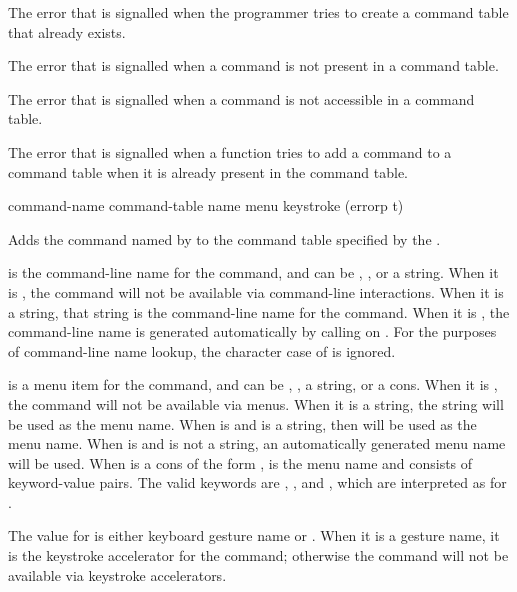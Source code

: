 
The error that is signalled when the programmer tries to create a command table
that already exists.


The error that is signalled when a command is not present in a command table.


The error that is signalled when a command is not accessible in a command table.


The error that is signalled when a function tries to add a command to a command
table when it is already present in the command table.


 {command-name command-table 
                                       \key name menu keystroke (errorp t)}

Adds the command named by  to the command table specified by
the  .

 is the command-line name for the command, and can be ,
, or a string.  When it is , the command will not be available via
command-line interactions.  When it is a string, that string is the command-line
name for the command.  When it is , the command-line name is generated
automatically by calling  on .
For the purposes of command-line name lookup, the character case of 
is ignored.

 is a menu item for the command, and can be , , a
string, or a cons.  When it is , the command will not be available via
menus.  When it is a string, the string will be used as the menu name.  When
 is  and  is a string, then  will be used
as the menu name.  When  is  and  is not a string,
an automatically generated menu name will be used.  When  is a cons
of the form ,  is the menu
name and  consists of keyword-value pairs.  The valid
keywords are , , and , which are
interpreted as for .

The value for  is either keyboard gesture name or .  When
it is a gesture name, it is the keystroke accelerator for the command; otherwise
the command will not be available via keystroke accelerators.

